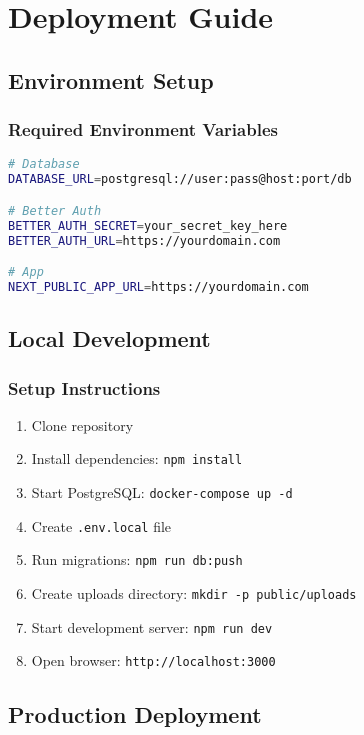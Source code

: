 \documentclass[12pt,a4paper]{report}
\begin{document}
\chapter{Deployment Guide}

\section{Environment Setup}

\subsection{Required Environment Variables}

\begin{lstlisting}[language=bash]
# Database
DATABASE_URL=postgresql://user:pass@host:port/db

# Better Auth
BETTER_AUTH_SECRET=your_secret_key_here
BETTER_AUTH_URL=https://yourdomain.com

# App
NEXT_PUBLIC_APP_URL=https://yourdomain.com
\end{lstlisting}

\section{Local Development}

\subsection{Setup Instructions}

\begin{enumerate}
    \item Clone repository
    \item Install dependencies: \texttt{npm install}
    \item Start PostgreSQL: \texttt{docker-compose up -d}
    \item Create \texttt{.env.local} file
    \item Run migrations: \texttt{npm run db:push}
    \item Create uploads directory: \texttt{mkdir -p public/uploads}
    \item Start development server: \texttt{npm run dev}
    \item Open browser: \texttt{http://localhost:3000}
\end{enumerate}

\section{Production Deployment}
\end{document}
